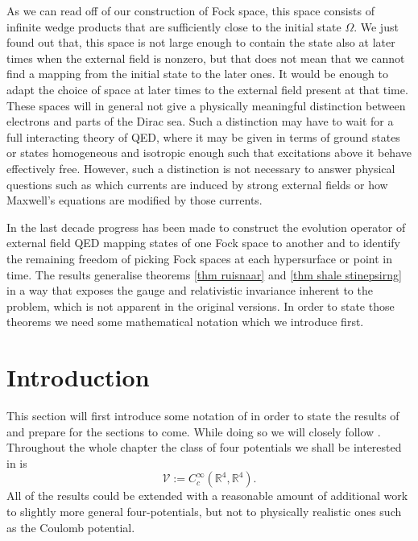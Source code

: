 \documentclass[b5paper,draft,openbib,12pt]{memoir}
\begin{document}
As we can read off of our construction of Fock space, this space 
consists of infinite wedge products that are sufficiently close 
to the initial state \(\Omega\). We just found out that, 
this space is not large enough to contain the state also at 
later times when the external field is nonzero, but that does 
not mean that we cannot find a mapping from the initial state 
to the later ones. It would be enough to adapt the choice of 
space at later times to the external field present at that time. 
These spaces will in general not give a physically meaningful 
distinction between electrons and parts of the Dirac sea. 
Such a distinction may have to wait 
for a full interacting theory of QED, where it may be given 
in terms of ground states or states homogeneous and isotropic 
enough such that excitations above it behave effectively free. 
However, such a distinction is not necessary to answer 
physical questions such as which currents are 
induced by strong external fields or how Maxwell's 
equations are modified by those currents.  

In the last decade progress has been made to construct 
the evolution operator of external 
field QED mapping states of one Fock space to another and 
to identify the remaining freedom of picking Fock spaces 
at each hypersurface or point in time. The results generalise 
theorems \ref{thm ruisnaar} and \ref{thm shale stinepsirng}
in a way that exposes the gauge and relativistic invariance 
inherent to the problem, which is not apparent 
in the original versions. In order to state those theorems 
we need some mathematical notation which we introduce first.


\section{Introduction}

This section will first introduce some notation of 
\cite{ivp0,ivp1,ivp2,deckert2016perspective} in order to 
state the results of \cite{ivp2} and prepare for the sections 
to come. While doing so we will closely follow 
\cite{deckert2016perspective}.
Throughout the whole chapter the class of four potentials we 
shall be 
interested in is 
\begin{equation}
  \mathcal{V}:= C_c^\infty(\mathbb{R}^4,\mathbb{R}^4).
\end{equation}
All of the results could be extended with a reasonable 
amount of additional work to slightly more general 
four-potentials, but not to physically realistic ones such as 
the Coulomb potential.  
\end{document}

